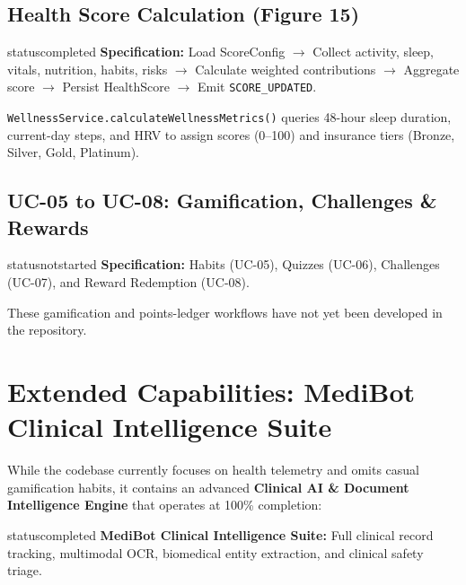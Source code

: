 \documentclass[11pt,a4paper]{article}
\begin{document}
\subsection{Health Score Calculation (Figure 15)}
\begin{statusbox}{statuscompleted}
    \textbf{Specification:} Load ScoreConfig $\to$ Collect activity, sleep, vitals, nutrition, habits, risks $\to$ Calculate weighted contributions $\to$ Aggregate score $\to$ Persist HealthScore $\to$ Emit \texttt{SCORE\_UPDATED}.
\end{statusbox}
\texttt{WellnessService.calculateWellnessMetrics()} queries 48-hour sleep duration, current-day steps, and HRV to assign scores (0--100) and insurance tiers (Bronze, Silver, Gold, Platinum).

\subsection{UC-05 to UC-08: Gamification, Challenges \& Rewards}
\begin{statusbox}{statusnotstarted}
    \textbf{Specification:} Habits (UC-05), Quizzes (UC-06), Challenges (UC-07), and Reward Redemption (UC-08).
\end{statusbox}
These gamification and points-ledger workflows have not yet been developed in the repository.

\newpage

\section{Extended Capabilities: MediBot Clinical Intelligence Suite}

While the codebase currently focuses on health telemetry and omits casual gamification habits, it contains an advanced \textbf{Clinical AI \& Document Intelligence Engine} that operates at 100\% completion:

\begin{statusbox}{statuscompleted}
    \textbf{MediBot Clinical Intelligence Suite:} Full clinical record tracking, multimodal OCR, biomedical entity extraction, and clinical safety triage.
\end{statusbox}
\end{document}
